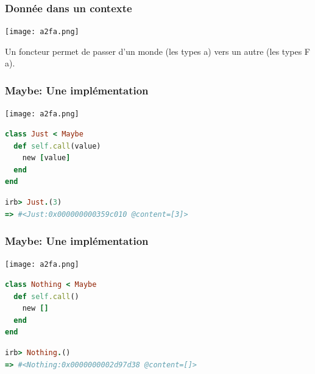 \documentclass{beamer}
\begin{document}
\begin{frame}
\frametitle{Donnée dans un contexte}

\begin{center}
\texttt{[image: a2fa.png]}
\end{center}

\begin{block}{}
Un foncteur permet de passer d'un monde (les types a) vers un autre (les types F a).
\end{block}

\end{frame}

\begin{frame}[fragile]
\frametitle{Maybe: Une implémentation}
\begin{center}
\texttt{[image: a2fa.png]}
\end{center}
\begin{block}{}
\begin{lstlisting}[language=ruby,basicstyle=\ttfamily,keywordstyle=\color{red}]
class Just < Maybe
  def self.call(value)
    new [value]
  end
end
\end{lstlisting}
\end{block}
\begin{block}{}
\begin{lstlisting}[language=ruby,basicstyle=\ttfamily,keywordstyle=\color{red}]
irb> Just.(3)
=> #<Just:0x000000000359c010 @content=[3]>
\end{lstlisting}
\end{block}
\end{frame}

\begin{frame}[fragile]
\frametitle{Maybe: Une implémentation}
\begin{center}
\texttt{[image: a2fa.png]}
\end{center}

\begin{block}{}
\begin{lstlisting}[language=ruby,basicstyle=\ttfamily,keywordstyle=\color{red}]
class Nothing < Maybe
  def self.call()
    new []
  end
end
\end{lstlisting}
\end{block}
\begin{block}{}
\begin{lstlisting}[language=ruby,basicstyle=\ttfamily,keywordstyle=\color{red}]
irb> Nothing.()
=> #<Nothing:0x0000000002d97d38 @content=[]>
\end{lstlisting}
\end{block}
\end{frame}
\end{document}
